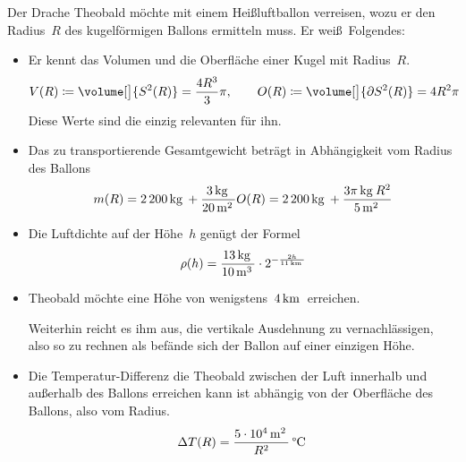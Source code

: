 \documentclass[../full]{subfiles}
\newcommand\Unit[2][]{
    \mskip \thinmuskip \relax \mathrm{#2}^{#1} \mskip \thinmuskip \relax
}
\newcommand\kg{\Unit{kg}}
\newcommand\m[1][]{\Unit[#1]{m}}
\newcommand\km[1][]{\Unit[#1]{km}}
\newcommand\Celsius{\Unit{\degree C}}
\newcommand\ThousandSep{\,}
\begin{document}

    Der Drache Theobald m\"ochte mit einem Hei\ss luftballon verreisen,
    wozu er den Radius~\( R \) des kugelf\"ormigen Ballons ermitteln muss.
    Er wei\ss\ Folgendes:
    \begin{itemize}
        \item
        Er kennt das Volumen
        und die Oberfl\"ache einer Kugel mit Radius~\( R \).
        \begin{equation*}
            V \paren{R}
            \coloneqq \volume[\big]{S^2 \paren{R}} = \frac{4 R^3}{3} \pi
            , \qquad
            O \paren{R}
            \coloneqq \volume[\big]{\partial S^2 \paren{R}} = 4 R^2 \pi
        \end{equation*}
        Diese Werte sind die einzig relevanten f\"ur ihn.

        \item
        Das zu transportierende Gesamtgewicht betr\"agt
        in Abh\"angigkeit vom Radius des Ballons
        \begin{equation*}
            m \paren{R}
            = 2\ThousandSep 200 \kg + \frac{3 \kg}{20 \m[2]} O \paren{R}
            = 2\ThousandSep 200 \kg + \frac{3 \pi \kg R^2}{5 \m[2]}
        \end{equation*}

        \item
        Die Luftdichte auf der H\"ohe~\( h \) gen\"ugt der Formel
        \begin{equation*}
            \rho \paren{h}
            = \frac{13 \kg}{10 \m[3]} \cdot 2^{-\frac{2h}{11 \km}}
        \end{equation*}

        \item
        Theobald m\"ochte eine H\"ohe von wenigstens~\( 4 \km \) erreichen.

        Weiterhin reicht es ihm aus,
        die vertikale Ausdehnung zu vernachl\"assigen,
        also so zu rechnen
        als bef\"ande sich der Ballon auf einer einzigen H\"ohe.

        \item
        Die Temperatur-Differenz die Theobald
        zwischen der Luft innerhalb und au\ss erhalb des Ballons erreichen kann
        ist abh\"angig von der Oberfl\"ache des Ballons, also vom Radius.
        \begin{equation*}
            \Delta T \paren{R} = \frac{5 \cdot 10^4 \m[2]}{R^2} \Celsius
        \end{equation*}


\end{itemize}
\end{document}

